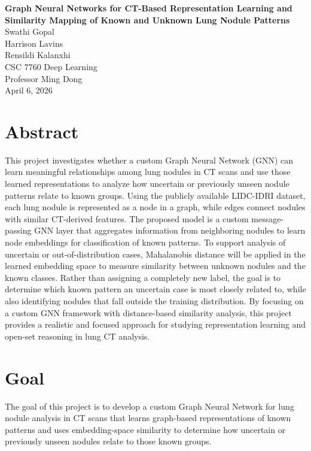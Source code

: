 \documentclass[12pt]{article}
\begin{document}
\begin{center}
    {\Large \textbf{Graph Neural Networks for CT-Based Representation Learning and Similarity Mapping of Known and Unknown Lung Nodule Patterns}}\\[1.5em]

    Swathi Gopal\\
    Harrison Lavins\\
    Rensildi Kalanxhi\\[1em]

    CSC 7760 Deep Learning\\
    Professor Ming Dong\\
    April 6, 2026
\end{center}

\section*{Abstract}

This project investigates whether a custom Graph Neural Network (GNN) can learn meaningful relationships among lung nodules in CT scans and use those learned representations to analyze how uncertain or previously unseen nodule patterns relate to known groups. Using the publicly available LIDC-IDRI dataset, each lung nodule is represented as a node in a graph, while edges connect nodules with similar CT-derived features. The proposed model is a custom message-passing GNN layer that aggregates information from neighboring nodules to learn node embeddings for classification of known patterns. To support analysis of uncertain or out-of-distribution cases, Mahalanobis distance will be applied in the learned embedding space to measure similarity between unknown nodules and the known classes. Rather than assigning a completely new label, the goal is to determine which known pattern an uncertain case is most closely related to, while also identifying nodules that fall outside the training distribution. By focusing on a custom GNN framework with distance-based similarity analysis, this project provides a realistic and focused approach for studying representation learning and open-set reasoning in lung CT analysis.

\section*{Goal}

The goal of this project is to develop a custom Graph Neural Network for lung nodule analysis in CT scans that learns graph-based representations of known patterns and uses embedding-space similarity to determine how uncertain or previously unseen nodules relate to those known groups.
\end{document}
